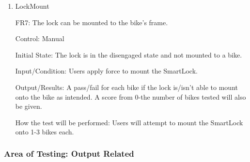 \documentclass[12pt, titlepage]{article}
\begin{document}
\begin{enumerate}

\item{LockMount

FR7: The lock can be mounted to the bike’s frame. }

Control: Manual

Initial State: The lock is in the disengaged state and not mounted to a bike.

Input/Condition: Users apply force to mount the SmartLock.

Output/Results: A pass/fail for each bike if the lock is/isn’t able to mount onto the bike as intended. A score from 0-the number of bikes tested will also be given.

How the test will be performed: Users will attempt to mount the SmartLock onto 1-3 bikes each.

\end{enumerate}

\subsubsection{Area of Testing: Output Related}
\end{document}
